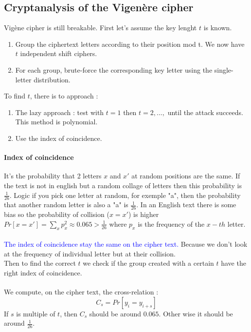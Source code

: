 \documentclass[11pt,a4paper]{report}
\begin{document}
\subsection{Cryptanalysis of the Vigenère cipher}
Vigène cipher is still breakable. First let's assume the key lenght $t$ is known. 
\begin{enumerate}
\item Group the ciphertext letters according to their position mod t. We now have $t$ independent shift ciphers.
\item For each group, brute-force the corresponding key letter using the single-letter distribution.
\end{enumerate}

To find $t$, there is to approach :
\begin{enumerate}
\item The lazy approach : test with $t = 1$ then $t=2,...,$ until the attack succeeds. This method is polynomial.
\item Use the index of coincidence.
\end{enumerate}
\paragraph{Index of coincidence}
It's the probability that 2 letters $x$ and $x'$ at random positions are the same. If the text is not in english but a random collage of letters then this probability is $\frac{1}{26}$. Logic if you pick one letter at random, for exemple "a", then the probability that another random letter is also a "a" is $\frac{1}{26}$. In an English text there is some bias so the probability of collision ($x=x'$) is higher $Pr\left[ x = x' \right] = \sum\limits_x p_x^2 \approx 0.065 > \frac{1}{26}$ where $p_x$ is the frequency of the $x-th$ letter.\\
\\
\textcolor{blue}{The index of coincidence stay the same on the cipher text.} Because we don't look at the frequency of individual letter but at their collision.\\
Then to find the correct $t$ we check if the group created with a certain  $t$ have the right index of coincidence.\\
\\
We compute, on the cipher text, the cross-relation :
$$C_s = Pr[y_i = y_{i+s}]$$
If $s$ is multiple of $t$, then $C_s$ should be around $0.065$. Other wise it should be around $\frac{1}{26}$.
\end{document}
